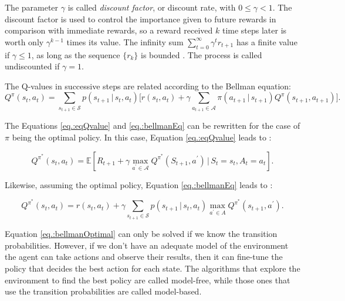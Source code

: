 The parameter $\gamma$ is called \textit{discount factor}, or discount rate, with $0 \leq \gamma < 1$.
%
The discount factor is used to control the importance given to future rewards in comparison with immediate rewards, so a reward received $k$ time steps later is worth only $\gamma^{k-1}$ times its value.
%
The infinity sum $\sum_{t=0}^{\infty} \gamma^{t} r_{t+1}$ has a finite value if $\gamma \leq 1$, as long as the sequence $\{r_k\}$ is bounded \cite{sutton2018rl}.
%
The process is called undiscounted if $\gamma=1$.


The Q-values in successive steps are related according to the Bellman equation:
\begin{equation} \label{eq.:bellmanEq}
    Q^{\pi}(s_t, a_t)= \sum_{s_{t+1} \in \mathcal{S}} p\left(s_{t+1} \, | \, s_t , a_t \right) \bigg[ r\left(s_t, a_t \right)  +
    \gamma \sum_{a_{t+1} \in \mathcal{A}} \pi\left(a_{t+1} \, | \, s_{t+1}\right) Q^{\pi}\left(s_{t+1}, a_{t+1}\right)  \bigg] \text{.}
\end{equation}

The Equations \eqref{eq.:eqQvalue} and \eqref{eq.:bellmanEq} can be rewritten for the case of $\pi$ being the optimal policy.
%
In this case, Equation \eqref{eq.:eqQvalue} leads to \cite{sutton2018rl}:

\begin{equation} \label{E_Optimal}
    Q^{\pi^*}\left(s_t, a_t\right)=\mathbb{E}\left[R_{t+1}+\gamma \max _{a^\prime \in \mathcal{A}} Q^{\pi^*}\left(S_{t+1}, a^\prime \right) \, | \, S_t=s_t, A_t=a_t\right] \text{.}
\end{equation}

Likewise, assuming the optimal policy, Equation \eqref{eq.:bellmanEq} leads to \cite{DRL_AMC}:

\begin{equation} \label{eq.:bellmanOptimal}
    Q^{\pi^*}\left(s_t, a_t\right)=r(s_t,a_t)+ \gamma \sum_{s_{t+1} \in \mathcal{S}} p\left(s_{t+1} \, | \, s_t,a_t\right) \max _{a^\prime \in A} Q^{\pi^*}\left(s_{t+1}, a^\prime \right) \text{.}
\end{equation}


Equation \eqref{eq.:bellmanOptimal} can only be solved if we know the transition probabilities.
%
However, if we don't have an adequate model of the environment the agent can take actions and observe their results, then it can fine-tune the policy that decides the best action for each state.
%
The algorithms that explore the environment to find the best policy are called model-free, while those ones that use the transition probabilities are called model-based.


